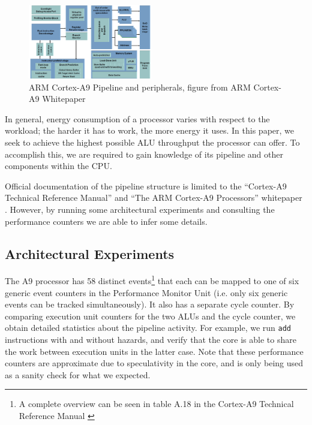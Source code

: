 \begin{figure}
    \begin{centering}
        \includegraphics[width=0.48\textwidth]{figures/A9-Pipeline-hres}
        \caption{ARM Cortex-A9 Pipeline and peripherals,\hfill
        figure from ARM Cortex-A9 Whitepaper\cite{a9whitepaper}}
        \label{fig:pipeline}
    \end{centering}
\end{figure}

In general, energy consumption of a processor varies with respect to the
workload; the harder it has to work, the more energy it uses. In this paper, we
seek to achieve the highest possible ALU throughput the processor can offer. To
accomplish this, we are required to gain knowledge of its pipeline and other
components within the CPU.

Official documentation of the pipeline structure is limited to the ``Cortex-A9
Technical Reference Manual'' \cite{armtech} and ``The ARM Cortex-A9 Processors''
whitepaper \cite{a9whitepaper}. However, by running some architectural
experiments and consulting the performance counters we are able to
infer some details.

\subsection{Architectural Experiments}
\label{arch_experiments}
The A9 processor has 58 distinct events\footnote{A complete overview can be seen
in table A.18 in the Cortex-A9 Technical Reference Manual \cite{armtech}} that
each can be mapped to one of six generic event counters in the Performance
Monitor Unit (i.e. only six generic events can be tracked simultaneously). It
also has a separate cycle counter. By comparing execution unit counters for the
two ALUs and the cycle counter, we obtain detailed statistics about the pipeline
activity. For example, we run \texttt{add} instructions with and without
hazards, and verify that the core is able to share the work between execution
units in the latter case. Note that these performance counters are approximate
due to speculativity in the core, and is only being used as a sanity check for
what we expected.

